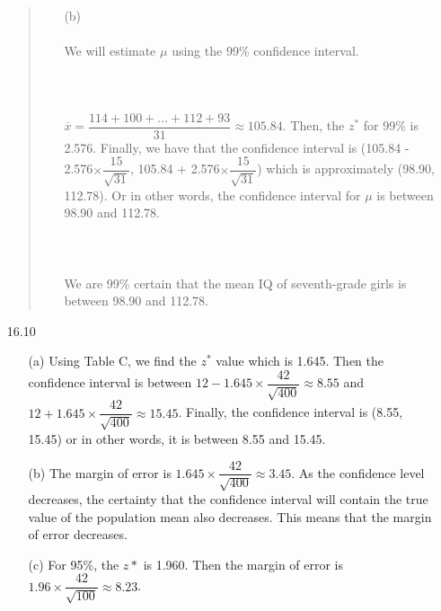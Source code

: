 \documentclass[11pt, a4paper]{article}
\newcommand\und[1]{\underline{\smash{#1}}}
\begin{document}
\begin{itemize}
\begin{quote}
\begin{itemize}
\item[]

\item[(b)]
\und{\textbf{PLAN}}\\\\
We will estimate $\mu$ using the 99\% confidence interval.\\\\

\und{\textbf{SOLVE}}\\\\
$\overline{x} = \dfrac{114 + 100 + \dots + 112 + 93}{31} \approx 105.84$.
Then, the $z^*$ for 99\% is 2.576. Finally, we have that the confidence
interval is (105.84 - 2.576$\times \dfrac{15}{\sqrt{31}}$, 105.84 + 2.576$\times \dfrac{15}{\sqrt{31}}$) which is approximately
(98.90, 112.78). Or in other words, the confidence interval for $\mu$ is between 98.90 and 112.78.\\\\

\und{\textbf{SOLVE}}\\\\
We are 99\% certain that the mean IQ of seventh-grade girls is between
98.90 and 112.78.
\end{itemize}
\end{quote}

\newpage

\item[16.10]
\begin{itemize}
\item[(a)]
Using Table C, we find the $z^*$ value which is 1.645.
Then the confidence interval is between $12 - 1.645 \times \dfrac{42}{\sqrt{400}} \approx 8.55$
and $12 + 1.645 \times \dfrac{42}{\sqrt{400}} \approx 15.45$. Finally,
the confidence interval is (8.55, 15.45) or in other words, it is between
8.55 and 15.45.

\item[]

\item[(b)]
The margin of error is $1.645 \times \dfrac{42}{\sqrt{400}} \approx 3.45$.
As the confidence level decreases, the certainty that the confidence interval
will contain the true value of the population mean also decreases. This means
that the margin of error decreases.

\item[]

\item[(c)]
For 95\%, the $z*$ is 1.960. Then the margin of error is $1.96 \times \dfrac{42}{\sqrt{100}} \approx 8.23$.


\end{itemize}
\end{itemize}
\end{document}
